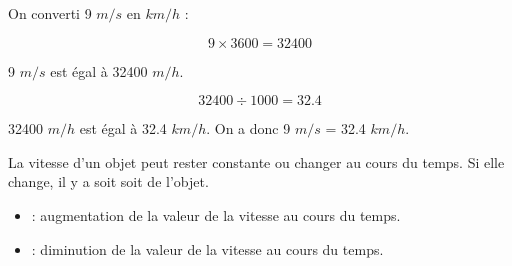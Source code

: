 \documentclass[12pt,a4paper]{article}
\begin{document}
\begin{myex}
	On converti 9 $m/s$ en $km/h$ :
	
	\begin{equation*}
		9 \times \num{3600} = \num{32400}
	\end{equation*}
	
	9 $m/s$ est égal à \num{32400} $m/h$.
	
	\begin{equation*}
		\num{32400} \div \num{1000} = \num{32.4}
	\end{equation*}
	
	\num{32400} $m/h$ est égal à \num{32.4} $km/h$. On a donc 9 $m/s$ = \num{32.4} $km/h$.
		
\end{myex}



\begin{mydefs}
La vitesse d'un objet peut rester constante ou changer au cours du temps.
Si elle change, il y a soit  soit  de l'objet. 

\begin{itemize}
	\item {} : \pause  augmentation de la valeur de la vitesse au cours du temps.\pause
	
	\item {} : \pause diminution de la valeur de la vitesse au cours du temps.
\end{itemize}


\end{mydefs}
\end{document}
